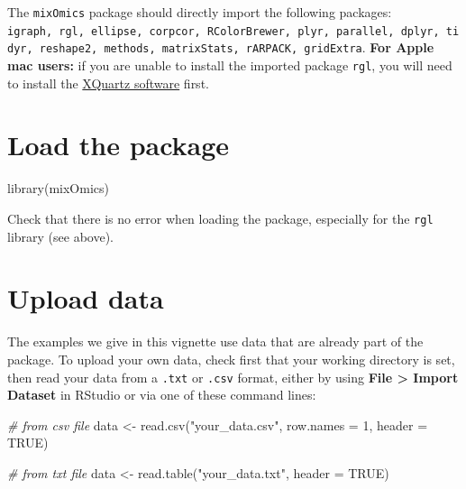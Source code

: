 \documentclass[
]{book}
\newenvironment{Shaded}{\begin{snugshade}}{\end{snugshade}}
\newcommand{\AttributeTok}[1]{\textcolor[rgb]{0.77,0.63,0.00}{#1}}
\newcommand{\CommentTok}[1]{\textcolor[rgb]{0.56,0.35,0.01}{\textit{#1}}}
\newcommand{\ConstantTok}[1]{\textcolor[rgb]{0.00,0.00,0.00}{#1}}
\newcommand{\DecValTok}[1]{\textcolor[rgb]{0.00,0.00,0.81}{#1}}
\newcommand{\FunctionTok}[1]{\textcolor[rgb]{0.00,0.00,0.00}{#1}}
\newcommand{\NormalTok}[1]{#1}
\newcommand{\OtherTok}[1]{\textcolor[rgb]{0.56,0.35,0.01}{#1}}
\newcommand{\StringTok}[1]{\textcolor[rgb]{0.31,0.60,0.02}{#1}}
\begin{document}
The \texttt{mixOmics} package should directly import the following packages:
\texttt{igraph,\ rgl,\ ellipse,\ corpcor,\ RColorBrewer,\ plyr,\ parallel,\ dplyr,\ tidyr,\ reshape2,\ methods,\ matrixStats,\ rARPACK,\ gridExtra}.
\textbf{For Apple mac users:} if you are unable to install the imported package \texttt{rgl}, you will need to install the \href{https://www.xquartz.org}{XQuartz software} first.

\hypertarget{02:load-data}{%
\section{Load the package}\label{02:load-data}}

\begin{Shaded}
\begin{Highlighting}[]
\FunctionTok{library}\NormalTok{(mixOmics)}
\end{Highlighting}
\end{Shaded}

Check that there is no error when loading the package, especially for the \texttt{rgl} library (see above).

\hypertarget{upload-data}{%
\section{Upload data}\label{upload-data}}

The examples we give in this vignette use data that are already part of the package. To upload your own data, check first that your working directory is set, then read your data from a \texttt{.txt} or \texttt{.csv} format, either by using \textbf{File \textgreater{} Import Dataset} in RStudio or via one of these command lines:

\begin{Shaded}
\begin{Highlighting}[]
\CommentTok{\# from csv file}
\NormalTok{data }\OtherTok{\textless{}{-}} \FunctionTok{read.csv}\NormalTok{(}\StringTok{"your\_data.csv"}\NormalTok{, }\AttributeTok{row.names =} \DecValTok{1}\NormalTok{, }\AttributeTok{header =} \ConstantTok{TRUE}\NormalTok{)}

\CommentTok{\# from txt file}
\NormalTok{data }\OtherTok{\textless{}{-}} \FunctionTok{read.table}\NormalTok{(}\StringTok{"your\_data.txt"}\NormalTok{, }\AttributeTok{header =} \ConstantTok{TRUE}\NormalTok{)}
\end{Highlighting}
\end{Shaded}
\end{document}
